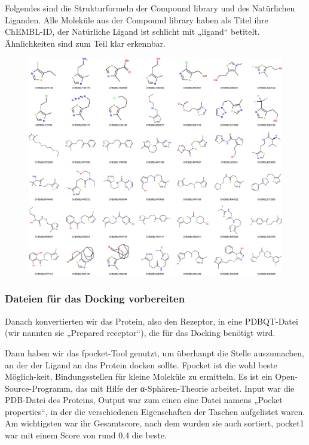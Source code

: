 \documentclass[11pt]{article}
\begin{document}
    Folgendes sind die Strukturformeln der Compound library und des Natürlichen Liganden.
    Alle Moleküle aus der Compound library haben als Titel ihre ChEMBL-ID, der Natürliche Ligand ist schlicht mit „ligand“ betitelt.
    Ähnlichkeiten sind zum Teil klar erkennbar.

    \begin{figure}
        \includegraphics[width=\textwidth]{P. Falciparum - ligands - visual}\label{fig:figure}
    \end{figure}

    \subsubsection{Dateien für das Docking vorbereiten}\label{subsubsec:dateien-fuer-das-docking-vorbereiten}

    Danach konvertierten wir das Protein, also den Rezeptor, in eine PDBQT-Datei (wir nannten sie „Prepared receptor“), die für das Docking benötigt wird.

    Dann haben wir das fpocket-Tool genutzt, um überhaupt die Stelle auszumachen, an der der Ligand an das Protein docken sollte.
    Fpocket ist die wohl beste Möglich-keit, Bindungsstellen für kleine Moleküle zu ermitteln.
    Es ist ein Open-Source-Programm, das mit Hilfe der α-Sphären-Theorie arbeitet.
    Input war die PDB-Datei des Proteins, Output war zum einen eine Datei namens „Pocket properties“, in der die verschiedenen Eigenschaften der Taschen aufgelistet waren.
    Am wichtigsten war ihr Gesamtscore, nach dem wurden sie auch sortiert, pocket1 war mit einem Score von rund 0,4 die beste.
\end{document}
